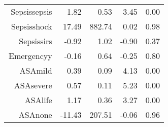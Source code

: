 \begin{tabular}{rrrrr}
$$  Sepsis\-sepsis & 1.82 & 0.53 & 3.45 & 0.00 \\ 
  Sepsis\-shock & 17.49 & 882.74 & 0.02 & 0.98 \\ 
  Sepsis\-sirs & -0.92 & 1.02 & -0.90 & 0.37 \\ 
  Emergency\-y & -0.16 & 0.64 & -0.25 & 0.80 \\ 
  ASA\-mild & 0.39 & 0.09 & 4.13 & 0.00 \\ 
  ASA\-severe & 0.57 & 0.11 & 5.23 & 0.00 \\ 
  ASA\-life & 1.17 & 0.36 & 3.27 & 0.00 \\ 
  ASA\-none & -11.43 & 207.51 & -0.06 & 0.96 \\ 
   \hline
\end{tabular}

\bigskip\bigskip
\centering
